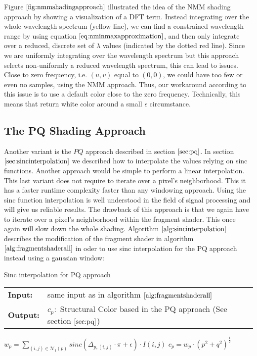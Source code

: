 Figure $\ref{fig:nmmshadingapproach}$ illustrated the idea of the NMM shading approach by showing a visualization of a DFT term. Instead integrating over the whole wavelength spectrum (yellow line), we can find a constrained wavelength range by using equation $\ref{eq:nminmaxapproximation}$, and then only integrate over a reduced, discrete set of $\lambda$ values (indicated by the dotted red line). Since we are uniformly integrating over the wavelength spectrum but this approach selects non-uniformly a reduced wavelength spectrum, this can lead to issues. Close to zero frequency, i.e. $(u,v)$ equal to $(0,0)$, we could have too few or even no samples, using the NMM approach. Thus, our workaround according to this issue is to use a default color close to the zero frequency. Technically, this means that return white color around a small $\epsilon$ circumstance.

\subsection{The PQ Shading Approach}
\label{sec:pqapproach}
Another variant is the $PQ$ approach described in section $\ref{sec:pq}$. In section $\ref{sec:sincinterpolation}$ we described how to interpolate the values relying on sinc functions. Another approach would be simple to perform a linear interpolation. This last variant does not require to iterate over a pixel's neighborhood. This it has a faster runtime complexity faster than any windowing approach. Using the sinc function interpolation is well understood in the field of signal processing and will give us reliable results. The drawback of this approach is that we again have to iterate over a pixel's neighborhood within the fragment shader. This once again will slow down the whole shading. Algorithm $\ref{alg:sincinterpolation}$ describes the modification of the fragment shader in algorithm $\ref{alg:fragmentshaderall}$ in oder to use sinc interpolation for the PQ approach instead using a gaussian window:

\begin{algorithm}[H]
\caption{Sinc interpolation for PQ approach}
\begin{table}[H]
  \begin{tabular}{@{}lll@{}}
    \textbf{Input:} & same input as in algorithm $\ref{alg:fragmentshaderall}$ \\
    \textbf{Output:} & $c_p:$ Structural Color based in the PQ approach (See section $\ref{sec:pq}$) \\
  \end{tabular} 
\end{table}
\setlength{\fboxrule}{0pt} 
\begin{boxedminipage}{1.0\textwidth}
  \begin{algorithmic}[1]
      \State $w_p = \sum_{(i,j) \in \mathcal{N}_{1}(p)} sinc(\Delta_{p,(i,j)} \cdot \pi + \epsilon) \cdot I(i,j)$
      \State $c_p = w_p \cdot (p^2 + q^2)^{\frac{1}{2}}$
    \EndFor
  \end{algorithmic}
  \end{boxedminipage}
  \vskip1.5pt
\label{alg:sincinterpolation}
\end{algorithm}

